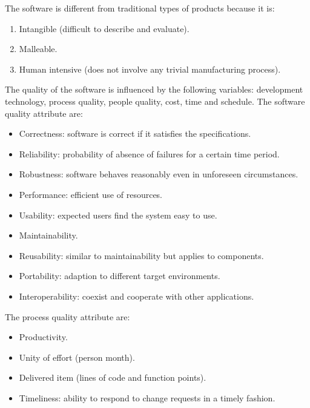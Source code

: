 \documentclass[12pt, a4paper]{report}
\newtheorem[style=M,bodystyle=\normalfont]{theorem}{Theorem}
\newtheorem[style=M,bodystyle=\normalfont]{corollary}{Corollary}
\newtheorem[style=M,bodystyle=\normalfont]{lemma}{Lemma}
\newtheorem[style=M,bodystyle=\normalfont]{definition}{Definition}
\begin{document}
    The software is different from traditional types of products because it is: 
    \begin{enumerate}
        \item Intangible (difficult to describe and evaluate).
        \item Malleable.
        \item Human intensive (does not involve any trivial manufacturing process).
    \end{enumerate}
    The quality of the software is influenced by the following variables: development technology, process quality, people quality, 
    cost, time and schedule. The software quality attribute are:
    \begin{itemize}
        \item Correctness: software is correct if it satisfies the specifications.
        \item Reliability: probability of absence of failures for a certain time period.
        \item Robustness: software behaves reasonably even in unforeseen circumstances.
        \item Performance: efficient use of resources.
        \item Usability: expected users find the system easy to use.
        \item Maintainability.
        \item Reusability: similar to maintainability but applies to components.
        \item Portability: adaption to different target environments.
        \item Interoperability: coexist and cooperate with other applications. 
    \end{itemize}
    The process quality attribute are:
    \begin{itemize}
        \item Productivity.
        \item Unity of effort (person month).
        \item Delivered item (lines of code and function points).
        \item Timeliness: ability to respond to change requests in a timely fashion.
    \end{itemize}
\end{document}
